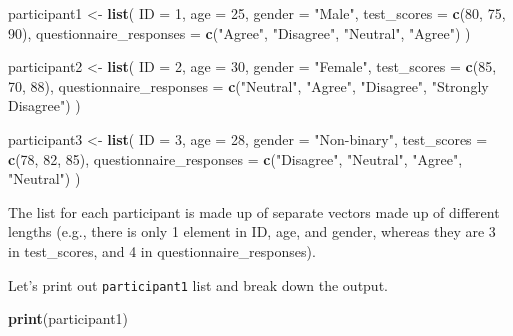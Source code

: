 \documentclass[
]{book}
\newenvironment{Shaded}{\begin{snugshade}}{\end{snugshade}}
\newcommand{\AttributeTok}[1]{\textcolor[rgb]{0.13,0.29,0.53}{#1}}
\newcommand{\DecValTok}[1]{\textcolor[rgb]{0.00,0.00,0.81}{#1}}
\newcommand{\FunctionTok}[1]{\textcolor[rgb]{0.13,0.29,0.53}{\textbf{#1}}}
\newcommand{\NormalTok}[1]{#1}
\newcommand{\OtherTok}[1]{\textcolor[rgb]{0.56,0.35,0.01}{#1}}
\newcommand{\StringTok}[1]{\textcolor[rgb]{0.31,0.60,0.02}{#1}}
\begin{document}
\begin{Shaded}
\begin{Highlighting}[]
\NormalTok{participant1 }\OtherTok{\textless{}{-}} \FunctionTok{list}\NormalTok{(}
  \AttributeTok{ID =} \DecValTok{1}\NormalTok{,}
  \AttributeTok{age =} \DecValTok{25}\NormalTok{,}
  \AttributeTok{gender =} \StringTok{"Male"}\NormalTok{,}
  \AttributeTok{test\_scores =} \FunctionTok{c}\NormalTok{(}\DecValTok{80}\NormalTok{, }\DecValTok{75}\NormalTok{, }\DecValTok{90}\NormalTok{),}
  \AttributeTok{questionnaire\_responses =} \FunctionTok{c}\NormalTok{(}\StringTok{"Agree"}\NormalTok{, }\StringTok{"Disagree"}\NormalTok{, }\StringTok{"Neutral"}\NormalTok{, }\StringTok{"Agree"}\NormalTok{)}
\NormalTok{)}

\NormalTok{participant2 }\OtherTok{\textless{}{-}} \FunctionTok{list}\NormalTok{(}
  \AttributeTok{ID =} \DecValTok{2}\NormalTok{,}
  \AttributeTok{age =} \DecValTok{30}\NormalTok{,}
  \AttributeTok{gender =} \StringTok{"Female"}\NormalTok{,}
  \AttributeTok{test\_scores =} \FunctionTok{c}\NormalTok{(}\DecValTok{85}\NormalTok{, }\DecValTok{70}\NormalTok{, }\DecValTok{88}\NormalTok{),}
  \AttributeTok{questionnaire\_responses =} \FunctionTok{c}\NormalTok{(}\StringTok{"Neutral"}\NormalTok{, }\StringTok{"Agree"}\NormalTok{, }\StringTok{"Disagree"}\NormalTok{, }\StringTok{"Strongly Disagree"}\NormalTok{)}
\NormalTok{)}

\NormalTok{participant3 }\OtherTok{\textless{}{-}} \FunctionTok{list}\NormalTok{(}
  \AttributeTok{ID =} \DecValTok{3}\NormalTok{,}
  \AttributeTok{age =} \DecValTok{28}\NormalTok{,}
  \AttributeTok{gender =} \StringTok{"Non{-}binary"}\NormalTok{,}
  \AttributeTok{test\_scores =} \FunctionTok{c}\NormalTok{(}\DecValTok{78}\NormalTok{, }\DecValTok{82}\NormalTok{, }\DecValTok{85}\NormalTok{),}
  \AttributeTok{questionnaire\_responses =} \FunctionTok{c}\NormalTok{(}\StringTok{"Disagree"}\NormalTok{, }\StringTok{"Neutral"}\NormalTok{, }\StringTok{"Agree"}\NormalTok{, }\StringTok{"Neutral"}\NormalTok{)}
\NormalTok{)}
\end{Highlighting}
\end{Shaded}

The list for each participant is made up of separate vectors made up of different lengths (e.g., there is only 1 element in ID, age, and gender, whereas they are 3 in test\_scores, and 4 in questionnaire\_responses).

Let's print out \texttt{participant1} list and break down the output.

\begin{Shaded}
\begin{Highlighting}[]
\FunctionTok{print}\NormalTok{(participant1)}
\end{Highlighting}
\end{Shaded}
\end{document}
